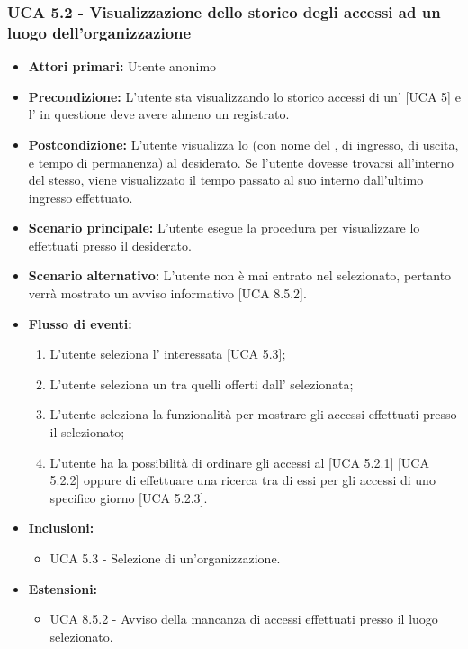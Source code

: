 \subsubsection{UCA 5.2 - Visualizzazione dello storico degli accessi ad un luogo dell'organizzazione}
\begin{itemize}
    \item \textbf{Attori primari:} Utente anonimo
    \item \textbf{Precondizione:} L'utente sta visualizzando lo storico accessi di un' [UCA 5] e l' in questione deve avere almeno un  registrato.
    \item \textbf{Postcondizione:} L'utente visualizza lo  (con nome del ,  di ingresso, di uscita, e tempo di permanenza) al  desiderato. Se l'utente dovesse trovarsi all'interno del  stesso, viene visualizzato il tempo passato al suo interno dall'ultimo ingresso effettuato.
    \item \textbf{Scenario principale:} L'utente esegue la procedura per visualizzare lo  effettuati presso il  desiderato.
    \item \textbf{Scenario alternativo:} L'utente non è mai entrato nel  selezionato, pertanto verrà mostrato un avviso informativo [UCA 8.5.2].
    \item \textbf{Flusso di eventi:}
    \begin{enumerate}
        \item L'utente seleziona l' interessata [UCA 5.3];
        \item L'utente seleziona un  tra quelli offerti dall' selezionata;
        \item L'utente seleziona la funzionalità per mostrare gli accessi effettuati presso il  selezionato;
        \item L'utente ha la possibilità di ordinare gli accessi al  [UCA 5.2.1] [UCA 5.2.2] oppure di effettuare una ricerca tra di essi per gli accessi di uno specifico giorno [UCA 5.2.3].
    \end{enumerate}
    \item \textbf{Inclusioni:}
    \begin{itemize}
        \item UCA 5.3 - Selezione di un'organizzazione.
    \end{itemize}
    \item \textbf{Estensioni:}
    \begin{itemize}
        \item UCA 8.5.2 - Avviso della mancanza di accessi effettuati presso il luogo selezionato.
    \end{itemize}
\end{itemize}

